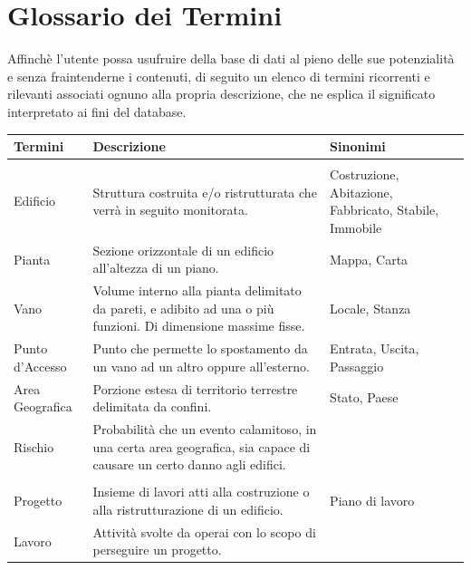 \documentclass[12pt,a4paper]{report}
\begin{document}
\tableofcontents

\chapter{Glossario dei Termini}
    Affinchè l'utente possa usufruire della base di dati al pieno delle sue potenzialità e senza fraintenderne i contenuti, di seguito un elenco di termini ricorrenti e rilevanti associati ognuno alla propria descrizione, che ne esplica il significato interpretato ai fini del database.

    \begin{center}
        \begin{tabular}{|p{3cm}|p{8cm}|p{3cm}|}
            \hline
            \textbf{Termini} & \textbf{Descrizione} & \textbf{Sinonimi} \\
            \hline
            \rowcolor{giallo}
            \multicolumn{3}{|c|}{\textbf{Area Generale}} \\
            \hline
            Edificio&Struttura costruita e/o ristrutturata che verrà in seguito monitorata.&Costruzione, Abitazione, Fabbricato, Stabile, Immobile \\
            \hline
            Pianta&Sezione orizzontale di un edificio all'altezza di un piano.&Mappa, Carta \\
            \hline
            Vano&Volume interno alla pianta delimitato da pareti, e adibito ad una o più funzioni. Di dimensione massime fisse.&Locale, Stanza \\
            \hline
            Punto d'Accesso&Punto che permette lo spostamento da un vano ad un altro oppure all'esterno. &Entrata, Uscita, Passaggio \\
            \hline
            Area Geografica&Porzione estesa di territorio terrestre delimitata da confini.&Stato, Paese \\
            \hline
            Rischio&Probabilità che un evento calamitoso, in una certa area geografica, sia capace di causare un certo danno agli edifici. & \\
            \hline
            \rowcolor{celeste}
            \multicolumn{3}{|c|}{\textbf{Area Costruzione}} \\
            \hline
            Progetto&Insieme di lavori atti alla costruzione o alla ristrutturazione di un edificio.&Piano di lavoro \\
            \hline
            Lavoro&Attività svolte da operai con lo scopo di perseguire un progetto.& \\

\end{tabular}
\end{center}
\end{document}
